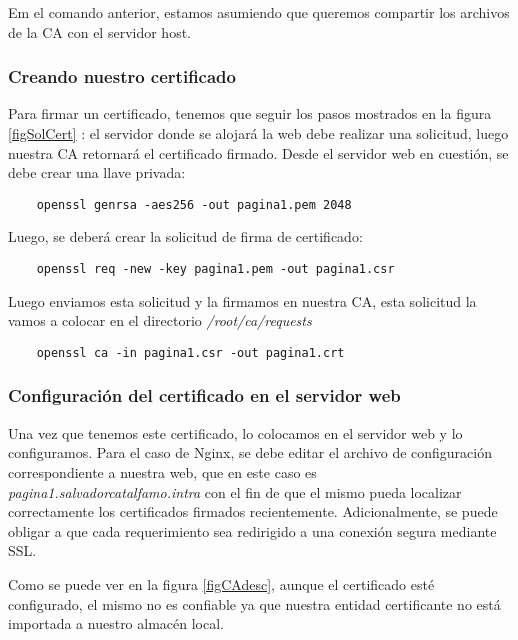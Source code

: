 Em el comando anterior, estamos asumiendo que queremos compartir los archivos de la CA con el servidor 
host.

 



\subsubsection*{Creando nuestro certificado}

Para firmar un certificado, tenemos que seguir los pasos mostrados en la figura \ref{figSolCert}
: el servidor donde se alojará la web debe realizar una solicitud, 
luego nuestra CA retornará el certificado firmado. Desde el servidor web en cuestión, se debe 
crear una llave privada:

\begin{verbatim}
    openssl genrsa -aes256 -out pagina1.pem 2048
\end{verbatim}

\noindent Luego, se deberá crear la solicitud de firma de certificado:
\begin{verbatim}
    openssl req -new -key pagina1.pem -out pagina1.csr
\end{verbatim}

\noindent Luego enviamos esta solicitud y la firmamos en nuestra CA, esta solicitud la vamos a colocar 
en el directorio \textit{/root/ca/requests}
\begin{verbatim}
    openssl ca -in pagina1.csr -out pagina1.crt
\end{verbatim}

\subsubsection*{Configuración del certificado en el servidor web}
Una vez que tenemos este certificado, lo colocamos en el servidor web y 
lo configuramos. Para el caso de Nginx, se debe editar el archivo de configuración 
correspondiente a nuestra web, que en este caso es \textit{pagina1.salvadorcatalfamo.intra}
con el fin de que el mismo pueda localizar correctamente los certificados firmados recientemente.
Adicionalmente, se puede obligar a que cada requerimiento sea redirigido a una conexión
segura mediante SSL.

Como se puede ver en la figura \ref{figCAdesc}, aunque el certificado esté configurado, 
el mismo no es confiable ya que nuestra entidad certificante no está importada a nuestro almacén 
local.

